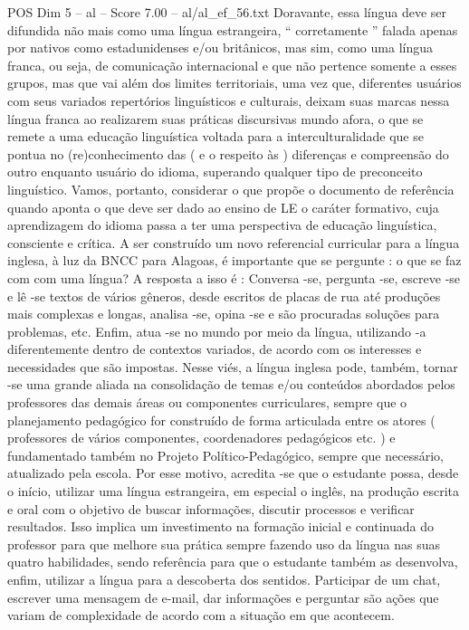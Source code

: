 \begin{textsample}{POS Dim 5 – al – Score 7.00 – al/al\_ef\_56.txt}
Doravante, essa língua deve ser difundida não mais como uma língua estrangeira, “ corretamente ” falada apenas por nativos como estadunidenses e/ou britânicos, mas sim, como uma língua franca, ou seja, de comunicação internacional e que não pertence somente a esses grupos, mas que vai além dos limites territoriais, uma vez que, diferentes usuários com seus variados repertórios linguísticos e culturais, deixam suas marcas nessa língua franca ao realizarem suas práticas discursivas mundo afora, o que se remete a uma educação linguística voltada para a interculturalidade que se pontua no (re)conhecimento das ( e o respeito às ) diferenças e compreensão do outro enquanto usuário do idioma, superando qualquer tipo de preconceito linguístico.
Vamos, portanto, considerar o que propõe o documento de referência quando aponta o que deve ser dado ao ensino de LE o caráter formativo, cuja aprendizagem do idioma passa a ter uma perspectiva de educação linguística, consciente e crítica.
A ser construído um novo referencial curricular para a língua inglesa, à luz da BNCC para Alagoas, é importante que se pergunte : o que se faz com com uma língua?
A resposta a isso é : Conversa -se, pergunta -se, escreve -se e lê -se textos de vários gêneros, desde escritos de placas de rua até produções mais complexas e longas, analisa -se, opina -se e são procuradas soluções para problemas, etc.
Enfim, atua -se no mundo por meio da língua, utilizando -a diferentemente dentro de contextos variados, de acordo com os interesses e necessidades que são impostas.
Nesse viés, a língua inglesa pode, também, tornar -se uma grande aliada na consolidação de temas e/ou conteúdos abordados pelos professores das demais áreas ou componentes curriculares, sempre que o planejamento pedagógico for construído de forma articulada entre os atores ( professores de vários componentes, coordenadores pedagógicos etc. ) e fundamentado também no Projeto Político-Pedagógico, sempre que necessário, atualizado pela escola.
Por esse motivo, acredita -se que o estudante possa, desde o início, utilizar uma língua estrangeira, em especial o inglês, na produção escrita e oral com o objetivo de buscar informações, discutir processos e verificar resultados.
Isso implica um investimento na formação inicial e continuada do professor para que melhore sua prática sempre fazendo uso da língua nas suas quatro habilidades, sendo referência para que o estudante também as desenvolva, enfim, utilizar a língua para a descoberta dos sentidos.
Participar de um chat, escrever uma mensagem de e-mail, dar informações e perguntar são ações que variam de complexidade de acordo com a situação em que acontecem.

\end{textsample}
